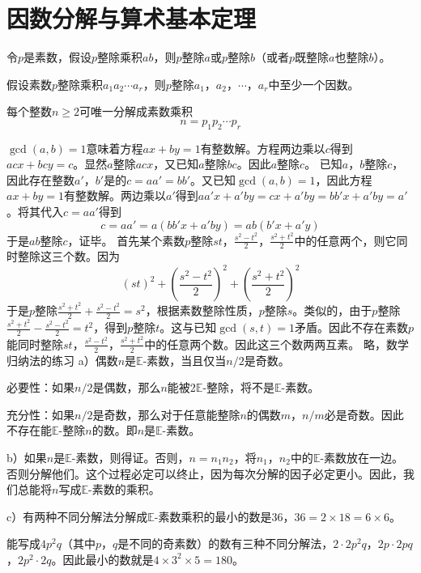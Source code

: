 \chapter{因数分解与算术基本定理}
\begin{lemma}
令$p$是素数，假设$p$整除乘积$ab$，则$p$整除$a$或$p$整除$b$（或者$p$既整除$a$也整除$b$）。
\end{lemma}
\begin{theorem}[素数整除性质]
假设素数$p$整除乘积$a_1a_2\cdots a_r$，则$p$整除$a_1$，$a_2$，$\cdots$，$a_r$中至少一个因数。
\end{theorem}
\begin{theorem}[素数基本定理]
每个整数$n\ge2$可唯一分解成素数乘积
\[n=p_1p_2\cdots p_r\]
\end{theorem}
%
\exercise \proof $\gcd(a,b)=1$意味着方程$ax+by=1$有整数解。方程两边乘以$c$得到$acx+bcy=c$。显然$a$整除$acx$，又已知$a$整除$bc$。因此$a$整除$c$。
%
\exercise \proof 已知$a$，$b$整除$c$，因此存在整数$a'$，$b'$是的$c=aa'=bb'$。又已知$\gcd(a,b)=1$，因此方程$ax+by=1$有整数解。两边乘以$a'$得到$aa'x+a'by=cx+a'by=bb'x+a'by=a'$。将其代入$c=aa'$得到
\[c=aa'=a(bb'x+a'by)=ab(b'x+a'y)\]
于是$ab$整除$c$，证毕。
%
\exercise \proof 首先某个素数$p$整除$st$，$\frac{s^2-t^2}{2}$，$\frac{s^2+t^2}{2}$中的任意两个，则它同时整除这三个数。因为
\[(st)^2+\left(\frac{s^2-t^2}{2}\right)^2+\left(\frac{s^2+t^2}{2}\right)^2\]
于是$p$整除$\frac{s^2+t^2}{2} + \frac{s^2-t^2}{2} = s^2$，根据素数整除性质，$p$整除$s$。类似的，由于$p$整除$\frac{s^2+t^2}{2} - \frac{s^2-t^2}{2} = t^2$，得到$p$整除$t$。这与已知$\gcd(s,t)=1$矛盾。因此不存在素数$p$能同时整除$st$，$\frac{s^2-t^2}{2}$，$\frac{s^2+t^2}{2}$中的任意两个数。因此这三个数两两互素。
%
\exercise 略，数学归纳法的练习
%
\exercise a）偶数$n$是$\mathbb{E}$-素数，当且仅当$n/2$是奇数。\par
\proof 必要性：如果$n/2$是偶数，那么$n$能被2$\mathbb{E}$-整除，将不是$\mathbb{E}$-素数。\par
充分性：如果$n/2$是奇数，那么对于任意能整除$n$的偶数$m$，$n/m$必是奇数。因此不存在能$\mathbb{E}$-整除$n$的数。即$n$是$\mathbb{E}$-素数。\par
b）如果$n$是$\mathbb{E}$-素数，则得证。否则，$n=n_1n_2$，将$n_1$，$n_2$中的$\mathbb{E}$-素数放在一边。否则分解他们。这个过程必定可以终止，因为每次分解的因子必定更小。因此，我们总能将$n$写成$\mathbb{E}$-素数的乘积。\par
c）有两种不同分解法分解成$\mathbb{E}$-素数乘积的最小的数是36，$36=2\times18=6\times6$。\par
能写成$4p^2q$（其中$p$，$q$是不同的奇素数）的数有三种不同分解法，$2\cdot2p^2q$，$2p\cdot 2pq$，$2p^2\cdot 2q$。因此最小的数就是$4\times3^2\times5=180$。\par
